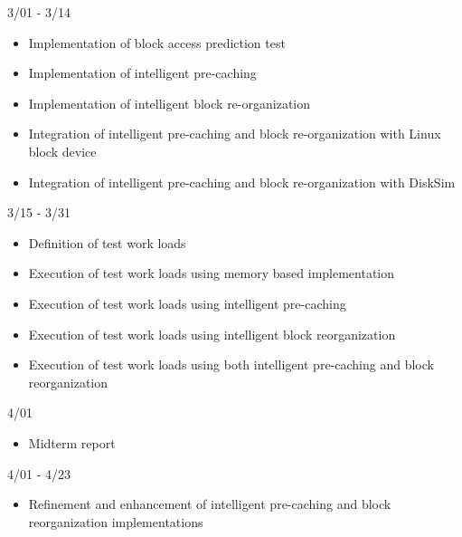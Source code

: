 \documentclass[letterpaper,twocolumn,10pt]{article}
\begin{document}
\begin{description}
\item[3/01 - 3/14]
\end{description}
\begin{itemize}
\setlength{\itemsep}{1pt}
\setlength{\parskip}{0pt}
\setlength{\parsep}{0pt}

\item Implementation of block access prediction test
\item Implementation of intelligent pre-caching
\item Implementation of intelligent block re-organization
\item Integration of intelligent pre-caching and block re-organization with Linux block device
\item Integration of intelligent pre-caching and block re-organization with DiskSim
\end{itemize}

\begin{description}
\item[3/15 - 3/31]
\end{description}
\begin{itemize}
\setlength{\itemsep}{1pt}
\setlength{\parskip}{0pt}
\setlength{\parsep}{0pt}

\item Definition of test work loads
\item Execution of test work loads using memory based implementation
\item Execution of test work loads using intelligent pre-caching
\item Execution of test work loads using intelligent block reorganization
\item Execution of test work loads using both intelligent pre-caching and block reorganization
\end{itemize}

\begin{description}
\item[4/01]
\end{description}
\begin{itemize}
\item Midterm report
\end{itemize}

\begin{description}
\item[4/01 - 4/23]
\end{description}
\begin{itemize}
\item Refinement and enhancement of intelligent pre-caching and block reorganization implementations
\end{itemize}
\end{document}
